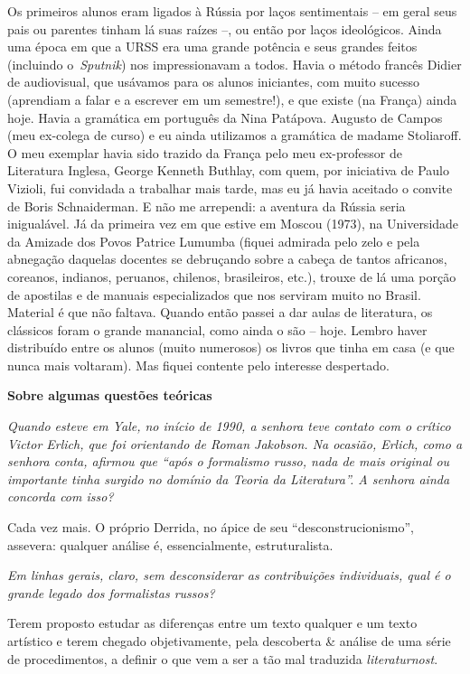 Os primeiros alunos eram ligados à Rússia por laços sentimentais -- em
geral seus pais ou parentes tinham lá suas raízes --, ou então por laços
ideológicos. Ainda uma época em que a URSS era uma grande potência e
seus grandes feitos (incluindo o~\emph{Sputnik}) nos impressionavam a
todos. Havia o método francês Didier de audiovisual, que usávamos para
os alunos iniciantes, com muito sucesso (aprendiam a falar e a escrever
em um semestre!), e que existe (na França) ainda hoje. Havia a gramática
em português da Nina Patápova. Augusto de Campos (meu ex-colega de
curso) e eu ainda utilizamos a gramática de madame Stoliaroff. O meu
exemplar havia sido trazido da França pelo meu ex-professor de
Literatura Inglesa, George Kenneth Buthlay, com quem, por iniciativa de
Paulo Vizioli, fui convidada a trabalhar mais tarde, mas eu já havia
aceitado o convite de Boris Schnaiderman. E não me arrependi: a aventura
da Rússia seria inigualável. Já da primeira vez em que estive em Moscou
(1973), na Universidade da Amizade dos Povos Patrice Lumumba (fiquei
admirada pelo zelo e pela abnegação daquelas docentes se debruçando
sobre a cabeça de tantos africanos, coreanos, indianos, peruanos,
chilenos, brasileiros, etc.), trouxe de lá uma porção de apostilas e de
manuais especializados que nos serviram muito no Brasil. Material é que
não faltava. Quando então passei a dar aulas de literatura, os clássicos
foram o grande manancial, como ainda o são -- hoje. Lembro haver
distribuído entre os alunos (muito numerosos) os livros que tinha em
casa (e que nunca mais voltaram). Mas fiquei contente pelo interesse
despertado.

\textbf{Sobre algumas questões teóricas~}

\emph{Quando esteve em Yale, no início de 1990, a senhora teve contato
com o crítico Victor Erlich, que foi orientando de Roman Jakobson. Na
ocasião, Erlich, como a senhora conta, afirmou que ``após o formalismo
russo, nada de mais original ou importante tinha surgido no domínio da
Teoria da Literatura''. A senhora ainda concorda com isso?}

Cada vez mais. O próprio Derrida, no ápice de seu
``desconstrucionismo'', assevera: qualquer análise é, essencialmente,
estruturalista.~

\emph{Em linhas gerais, claro, sem desconsiderar as contribuições
individuais, qual é o grande legado dos formalistas russos?}

Terem proposto estudar as diferenças entre um texto qualquer e um texto
artístico e terem chegado objetivamente, pela descoberta \& análise de
uma série de procedimentos, a definir o que vem a ser a tão mal
traduzida \emph{literaturnost}.

